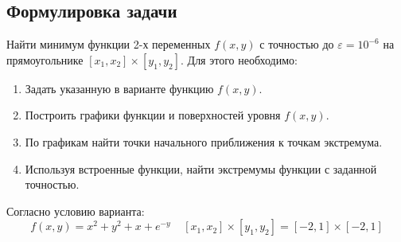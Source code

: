 \documentclass[12pt]{article}%
\begin{document}
\subsection{Формулировка задачи}
Найти минимум функции 2-х переменных $f(x, y)$ с точностью до $\varepsilon = 10^{-6}$ на прямоугольнике $[x_1, x_2] \times [y_1, y_2]$. Для этого необходимо:
\begin{enumerate}
    \item Задать указанную в варианте функцию $f(x, y)$.
    \item Построить графики функции и поверхностей уровня $f(x, y)$.
    \item По графикам найти точки начального приближения к точкам экстремума.
    \item Используя встроенные функции, найти экстремумы функции с заданной точностью.
\end{enumerate}
Согласно условию варианта:
\[
f(x, y) = x^2 + y^2 + x + e^{-y}\ \ \ \ \ 
[x_1, x_2] \times [y_1, y_2] = [-2, 1] \times [-2, 1]
\]
\end{document}
